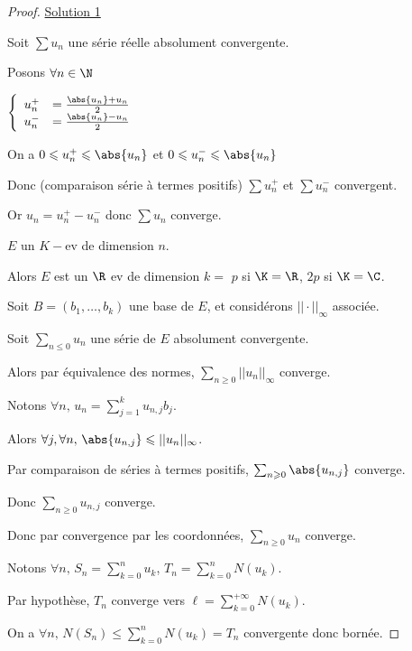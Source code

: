 \begin{proof} 
    \uline{Solution 1 }

    \svspace Soit $\sum u_n$ une série réelle absolument convergente.

    Posons $\forall n \in \N$

    $\left\{ \begin{array}{rl}
        u_n^+ & = \frac{\abs{u_n} + u_n}{ 2} \\
        u_n^- & = \frac{\abs{u_n} - u_n}{ 2}
    \end{array} \right.$

    On a $0 \leqslant u_n^+ \leqslant \abs{u_n}$ et $0 \leqslant u_n^- \leqslant \abs{u_n}$

    Donc (comparaison série à termes positifs) $\sum u_n^+$ et $\sum u_n^-$ convergent. 

    Or $u_n = u_n^+ - u_n^-$ donc $\sum u_n$ converge.

     $E$ un $K-$ev de dimension $n$. 
    
    Alors $E$ est un $\R$ ev de dimension $k = $ $p$ si $\K = \R$, $2p$ si $\K = \C$.

    Soit $B = (b_1, \ldots, b_k)$ une base de $E$, et considérons $|| \cdot ||_\infty$ associée. 

    Soit $\sum_{n \leqslant 0} u_n$ une série de $E$ absolument convergente.

    Alors par équivalence des normes, $\sum_{n \geqslant 0} || u_n ||_\infty$ converge.

    Notons $\displaystyle \forall n, \, u_n = \sum_{j = 1}^k u_{n, j} b_j$.

    Alors $\forall j, \forall n, \, \abs{u_{n, j}} \leqslant || u_n ||_\infty$.

    Par comparaison de séries à termes positifs, $\sum_{n \geqslant 0} \abs{u_{n, j}}$ converge.

    Donc $\sum_{n \geqslant 0} u_{n, j}$ converge. 

    Donc par convergence par les coordonnées, $\sum_{n \geqslant 0} u_n$ converge.



    Notons $\displaystyle \forall n, \, S_n = \sum_{k = 0}^{n } u_k $, $\displaystyle T_n = \sum_{k = 0 }^{n } N(u_k)$.

    Par hypothèse, $T_n$ converge vers $\displaystyle \ell = \sum_{k = 0}^{+\infty} N(u_k)$.

    On a $\forall n, \, N(S_n) \leqslant \sum_{k = 0 }^{n } N(u_k) = T_n$ convergente donc bornée. 


\end{proof}
